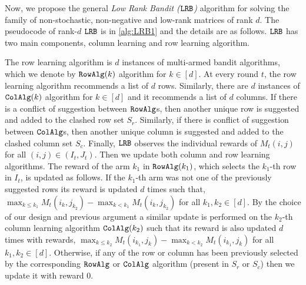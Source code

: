 
Now, we propose the general \emph{Low Rank Bandit (${\tt LRB}$)} algorithm for solving the family of non-stochastic, non-negative and low-rank matrices of rank $d$. The pseudocode of rank-$d$ ${\tt LRB}$ is in \cref{alg:LRB1} and the details are as follows. ${\tt LRB}$ has two main components, column learning and row learning algorithm. 

The row learning algorithm is $d$ instances of multi-armed bandit algorithms, which we denote by ${\tt RowAlg}(k)$ algorithm for $k \in [d]$. At every round $t$, the row learning algorithm recommends a list of $d$ rows. Similarly, there are $d$ instances of ${\tt ColAlg}(k)$ algorithm for $k \in [d]$ and it recommends a list of $d$ columns. If there is a conflict of suggestion between ${\tt RowAlg}$s, then another unique row is suggested and added to the clashed row set $S_r$. Similarly, if there is conflict of suggestion between ${\tt ColAlg}$s, then another unique column is suggested and added to the clashed column set  $S_c$. Finally, ${\tt LRB}$ observes the individual rewards of $M_t(i,j)$ for all $(i,j)\in (I_t, J_t)$. Then we update both column and row learning algorithms. The reward of the arm $k_1$ in ${\tt RowAlg}(k_1)$, which selects the $k_1$-th row in $I_t$, is updated as follows. If the $k_1$-th arm was not one of the previously suggested rows its reward is updated $d$ times such that, $\max_{k \leq k_1} M_t(i_k, j_{k_2}) - \max_{k < k_1} M_t(i_k, j_{k_2})$ for all $k_1,k_2 \in [d]$. By the choice of our design and previous argument a similar update is performed on the $k_2$-th column learning algorithm ${\tt ColAlg}(k_2)$ such that its reward is also updated $d$ times with rewards, $\max_{k \leq k_2} M_t(i_{k_1}, j_k)  - \max_{k < k_2} M_t(i_{k_1}, j_k)$ for all $k_1,k_2 \in [d]$. Otherwise, if any of the row or column has been previously selected by the corresponding ${\tt RowAlg}$ or ${\tt ColAlg}$ algorithm (present in $S_r$ or $S_c$) then we update it with reward $0$.

